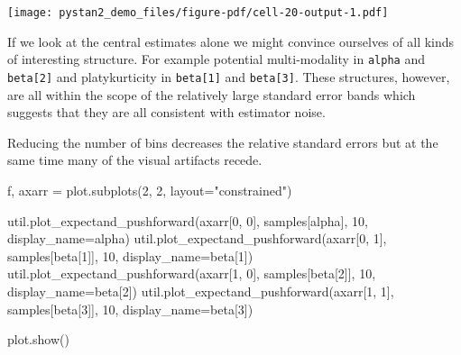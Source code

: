 \documentclass[
  letterpaper,
  DIV=11,
  numbers=noendperiod]{scrartcl}
\newenvironment{Shaded}{\begin{snugshade}}{\end{snugshade}}
\newcommand{\DecValTok}[1]{\textcolor[rgb]{0.68,0.00,0.00}{#1}}
\newcommand{\NormalTok}[1]{\textcolor[rgb]{0.00,0.23,0.31}{#1}}
\newcommand{\OperatorTok}[1]{\textcolor[rgb]{0.37,0.37,0.37}{#1}}
\newcommand{\StringTok}[1]{\textcolor[rgb]{0.13,0.47,0.30}{#1}}
\begin{document}
\texttt{[image: pystan2\_demo\_files/figure-pdf/cell-20-output-1.pdf]}

If we look at the central estimates alone we might convince ourselves of
all kinds of interesting structure. For example potential multi-modality
in \texttt{alpha} and \texttt{beta{[}2{]}} and platykurticity in
\texttt{beta{[}1{]}} and \texttt{beta{[}3{]}}. These structures,
however, are all within the scope of the relatively large standard error
bands which suggests that they are all consistent with estimator noise.

Reducing the number of bins decreases the relative standard errors but
at the same time many of the visual artifacts recede.

\begin{Shaded}
\begin{Highlighting}[]
\NormalTok{f, axarr }\OperatorTok{=}\NormalTok{ plot.subplots(}\DecValTok{2}\NormalTok{, }\DecValTok{2}\NormalTok{, layout}\OperatorTok{=}\StringTok{"constrained"}\NormalTok{)}

\NormalTok{util.plot\_expectand\_pushforward(axarr[}\DecValTok{0}\NormalTok{, }\DecValTok{0}\NormalTok{], samples[}\StringTok{\textquotesingle{}alpha\textquotesingle{}}\NormalTok{], }
                                \DecValTok{10}\NormalTok{, display\_name}\OperatorTok{=}\StringTok{\textquotesingle{}alpha\textquotesingle{}}\NormalTok{)}
\NormalTok{util.plot\_expectand\_pushforward(axarr[}\DecValTok{0}\NormalTok{, }\DecValTok{1}\NormalTok{], samples[}\StringTok{\textquotesingle{}beta[1]\textquotesingle{}}\NormalTok{], }
                                \DecValTok{10}\NormalTok{, display\_name}\OperatorTok{=}\StringTok{\textquotesingle{}beta[1]\textquotesingle{}}\NormalTok{)}
\NormalTok{util.plot\_expectand\_pushforward(axarr[}\DecValTok{1}\NormalTok{, }\DecValTok{0}\NormalTok{], samples[}\StringTok{\textquotesingle{}beta[2]\textquotesingle{}}\NormalTok{], }
                                \DecValTok{10}\NormalTok{, display\_name}\OperatorTok{=}\StringTok{\textquotesingle{}beta[2]\textquotesingle{}}\NormalTok{)}
\NormalTok{util.plot\_expectand\_pushforward(axarr[}\DecValTok{1}\NormalTok{, }\DecValTok{1}\NormalTok{], samples[}\StringTok{\textquotesingle{}beta[3]\textquotesingle{}}\NormalTok{], }
                                \DecValTok{10}\NormalTok{, display\_name}\OperatorTok{=}\StringTok{\textquotesingle{}beta[3]\textquotesingle{}}\NormalTok{)}

\NormalTok{plot.show()}
\end{Highlighting}
\end{Shaded}
\end{document}
